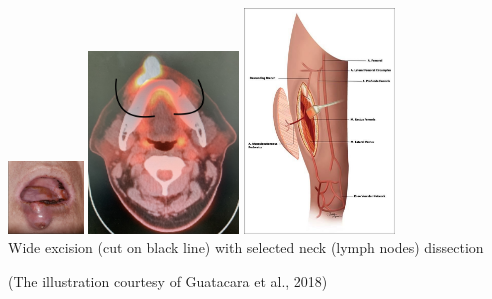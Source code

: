 \documentclass[
paper=landscape,
paper=160mm:90mm, %
fontsize=11pt, %
pagesize, %
parskip=half-, %
]{scrartcl} %
\theoremstyle{mythmstyle} %
\begin{document}
\includegraphics[width=2cm]{IMG_7174.jpg}
\includegraphics[width=4cm]{IMG_6430.jpg} %
\includegraphics[width=4cm]{Figure-5-Vascular-anatomy-of-ALT-flap-Guatacara-et-al-2018_W640.jpg}\\
\large Wide excision (cut on black line) with selected neck (lymph nodes) dissection\\
\hspace{2cm} 
{\tiny (The illustration courtesy of Guatacara et al., 2018) \par}
\end{document}
